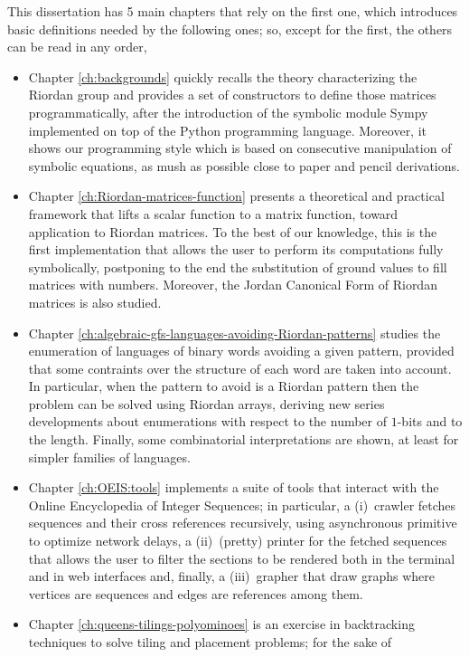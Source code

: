 This dissertation has 5 main chapters that rely on the first one, which
introduces basic definitions needed by the following ones; so, except for the
first, the others can be read in any order,
\begin{itemize}
\item Chapter \ref{ch:backgrounds} quickly recalls the theory characterizing
the Riordan group and provides a set of constructors to define those matrices
programmatically, after the introduction of the symbolic module Sympy
implemented on top of the Python programming language. Moreover, it shows our
programming style which is based on consecutive manipulation of symbolic
equations, as mush as possible close to paper and pencil derivations.
\item Chapter \ref{ch:Riordan-matrices-function} presents a theoretical and
practical framework that lifts a scalar function to a matrix function, toward
application to Riordan matrices. To the best of our knowledge, this is the
first implementation that allows the user to perform its computations fully
symbolically, postponing to the end the substitution of ground values to fill
matrices with numbers. Moreover, the Jordan Canonical Form of Riordan matrices
is also studied.
\item Chapter \ref{ch:algebraic-gfs-languages-avoiding-Riordan-patterns}
studies the enumeration of languages of binary words avoiding a given pattern,
provided that some contraints over the structure of each word are taken into
account.  In particular, when the pattern to avoid is a Riordan pattern then
the problem can be solved using Riordan arrays, deriving new series
developments about enumerations with respect to the number of $1$-bits and to
the length. Finally, some combinatorial interpretations are shown, at least for
simpler families of languages.
\item Chapter \ref{ch:OEIS:tools} implements a suite of tools that interact with
the Online Encyclopedia of Integer Sequences; in particular, a (i)~crawler fetches
sequences and their cross references recursively, using asynchronous primitive
to optimize network delays, a (ii)~(pretty) printer for the fetched sequences that
allows the user to filter the sections to be rendered both in the terminal and in
web interfaces and, finally, a (iii)~grapher that draw graphs where vertices
are sequences and edges are references among them.
\item Chapter \ref{ch:queens-tilings-polyominoes} is an exercise in
backtracking techniques to solve tiling and placement problems; for the sake of

\end{itemize}
